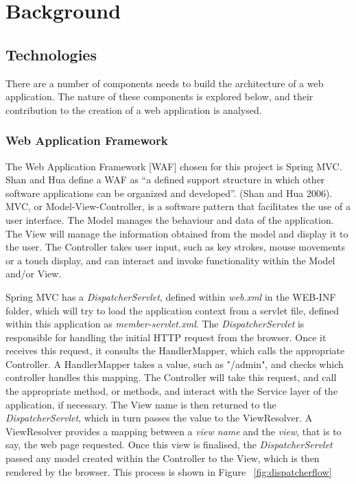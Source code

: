 \chapter{Background}
\label{background}

\section{Technologies}

There are a number of components needs to build the architecture of a web application. The nature of these components is explored below, and their contribution to the creation of a web application is analysed.

\subsection{Web Application Framework}
The Web Application Framework [WAF] chosen for this project is Spring MVC. Shan and Hua define a WAF as “a defined support structure in which other software applications can be organized and developed”. (Shan and Hua 2006). MVC, or Model-View-Controller, is a software pattern that facilitates the use of a user interface. The Model manages the behaviour and data of the application. The View will manage the information obtained from the model and display it to the user. The Controller takes user input, such as key strokes, mouse movements or a touch display, and can interact and invoke functionality within the Model and/or View.

Spring MVC has a \textit{DispatcherServlet}, defined within \textit{web.xml} in the WEB-INF folder, which will try to load the application context from a servlet file, defined within this application as \textit{member-servlet.xml}. The \textit{DispatcherServlet} is responsible for handling the initial HTTP request from the browser. Once it receives this request, it consults the HandlerMapper, which calls the appropriate Controller. A HandlerMapper takes a value, such as "/admin", and checks which controller handles this mapping. The Controller will take this request, and call the appropriate method, or methods, and interact with the Service layer of the application, if necessary. The View name is then returned to the \textit{DispatcherServlet}, which in turn passes the value to the ViewResolver. A ViewResolver provides a mapping between a \textit{view name} and the \textit{view}, that is to say, the web page requested. Once this view is finalised, the \textit{DispatcherServlet} passed any model created within the Controller to the View, which is then rendered by the browser. This process is shown in Figure ~\ref{fig:dispatcherflow}


